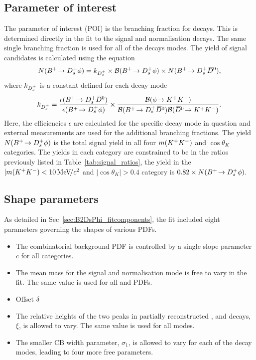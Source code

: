 
\subsection{Parameter of interest}

The parameter of interest (POI) is the branching fraction for \decay{\Bp}{\Dsp\phiz} decays. This is determined directly in the fit to the signal and normalisation decays. The same single branching fraction is used for all of the \Dsp decays modes.
The yield of signal candidates is calculated using the equation 
\begin{equation}
N({{{B}^+}}\!\rightarrow {\ensuremath{{D}^+_{s}}}\phi) = k_{{{D}^+_{s}}} \times {\ensuremath{\mathcal{B}}}({{{B}^+}}\!\rightarrow {\ensuremath{{D}^+_{s}}}\phi) \times N({{{B}^+}}\!\rightarrow {\ensuremath{{D}^+_{s}}}{\ensuremath{{\kern 0.2em\overline{\kern -0.2em D}{}}{}^0}}),
\end{equation}
where $k_{{{D}^+_{s}}}$ is a constant defined for each \Dsp decay mode
\begin{equation}
k_{{{D}^+_{s}}} = \frac{\epsilon({{{B}^+}}\!\rightarrow {\ensuremath{{D}^+_{s}}}{\ensuremath{{\kern 0.2em\overline{\kern -0.2em D}{}}{}^0}})}{\epsilon({{{B}^+}}\!\rightarrow {\ensuremath{{D}^+_{s}}}\phi)} \times  \frac{{\mathcal{B}}(\phi\!\rightarrow {\ensuremath{{K}^+}}{\ensuremath{{K}^-}})}{{\mathcal{B}}({{{B}^+}}\!\rightarrow {\ensuremath{{D}^+_{s}}}{\ensuremath{{\kern 0.2em\overline{\kern -0.2em D}{}}{}^0}}){\mathcal{B}}({{\kern 0.2em\overline{\kern -0.2em D}{}}{}^0}\!\rightarrow {\ensuremath{{K}^+}}{\ensuremath{{K}^-}})}.
\end{equation}
Here, the efficiencies $\epsilon$ are calculated for the specific \Dsp decay mode in question and external measurements are used for the additional branching fractions.
The yield $N({{{B}^+}}\!\rightarrow {\ensuremath{{D}^+_{s}}}\phi)$ is the total signal yield in all four $m({{K}^+}{{K}^-})$ and $\cos\theta_{K}$ categories. The yields in each category are constrained to be in the ratios previously listed in Table~\ref{tab:signal_ratios}, \ie the yield in the $|m({{K}^+}{{K}^-})<10{\mathrm{\,Me\kern -0.1em V\!/}c^2}$ and $|\cos\theta_{K}|>0.4$ category is $0.82\times N({{{B}^+}}\!\rightarrow {\ensuremath{{D}^+_{s}}}\phi)$.



\subsection{Shape parameters}
As detailed in Sec~\ref{sec:B2DsPhi_fitcomponents}, the fit included eight parameters governing the shapes of various PDFs.
\begin{itemize}
\item The combinatorial background PDF is controlled by a single slope parameter $c$ for all categories.
\item The mean \Bp mass for the signal and normalisation mode is free to vary in the fit. The same value is used for all \decay{\Bp}{\Dsp\phiz} and \decay{\Bp}{\Dsp\Dzb} PDFs.
\item {\color{Red}Offset $\delta$}
\item The relative heights of the two peaks in partially reconstructed \decay{\Bp}{\Dssp\phiz}, \decay{\Bp}{\Dssp\Dzb} and \decay{\Bp}{\Dsp\Dstarzb} decays, $\xi$, is allowed to vary. The same value is used for all modes.
\item The smaller CB width parameter, $\sigma_{1}$, is allowed to vary for each of the \Dsp decay modes, leading to four more free parameters. 
\end{itemize}

